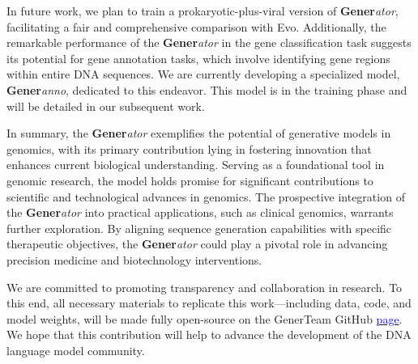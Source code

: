 In future work, we plan to train a prokaryotic-plus-viral version of \textbf{Gener}\textit{ator}, facilitating a fair and comprehensive comparison with Evo. Additionally, the remarkable performance of the \textbf{Gener}\textit{ator} in the gene classification task suggests its potential for gene annotation tasks, which involve identifying gene regions within entire DNA sequences. We are currently developing a specialized model, \textbf{Gener}\textit{anno}, dedicated to this endeavor. This model is in the training phase and will be detailed in our subsequent work.

In summary, the \textbf{Gener}\textit{ator} exemplifies the potential of generative models in genomics, with its primary contribution lying in fostering innovation that enhances current biological understanding. Serving as a foundational tool in genomic research, the model holds promise for significant contributions to scientific and technological advances in genomics. The prospective integration of the \textbf{Gener}\textit{ator} into practical applications, such as clinical genomics, warrants further exploration. By aligning sequence generation capabilities with specific therapeutic objectives, the \textbf{Gener}\textit{ator} could play a pivotal role in advancing precision medicine and biotechnology interventions.

We are committed to promoting transparency and collaboration in research. To this end, all necessary materials to replicate this work—including data, code, and model weights, will be made fully open-source on the GenerTeam GitHub \href{https://github.com/GenerTeam}{\textcolor{blue}{page}}. We hope that this contribution will help to advance the development of the DNA language model community.


